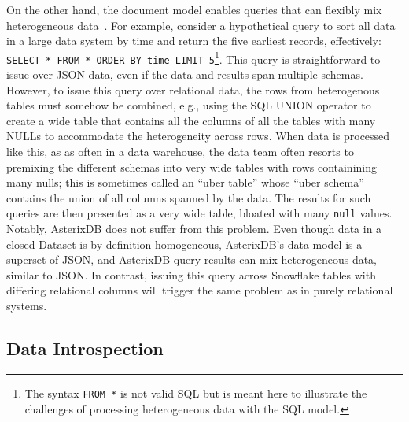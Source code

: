 On the other hand, the document model enables queries that can flexibly mix heterogeneous data~\cite{lorel, asterixdb}. For example, consider a hypothetical query to sort all data in a large data system by time and return the five earliest records, effectively: \texttt{SELECT * FROM * ORDER BY time LIMIT 5}\footnote{The syntax \texttt{FROM *} is not valid SQL but is meant here to illustrate the challenges of processing heterogeneous data with the SQL model.}. This query is straightforward to issue over JSON data, even if the data and results span multiple schemas. However, to issue this query over relational data, the rows from heterogenous tables must somehow be combined, e.g., using the SQL UNION operator to create a wide table that contains all the columns of all the tables with many NULLs to accommodate the heterogeneity across rows.  When data is processed like this, as as often in a data warehouse, the data team often resorts to premixing the different schemas into very wide tables with rows containining many nulls; this is sometimes called an ``uber table'' whose ``uber schema'' contains the union of all columns spanned by the data. The results for such queries are then presented as a very wide table, bloated with many \texttt{null} values. Notably, AsterixDB does not suffer from this problem. Even though data in a closed Dataset is by definition homogeneous, AsterixDB's data model is a superset of JSON, and AsterixDB query results can mix heterogeneous data, similar to JSON. In contrast, issuing this query across Snowflake tables with differing relational columns will trigger the same problem as in purely relational systems.


\vspace{-1em}

\subsection{Data Introspection} \label{ss:hybrid_schema}

